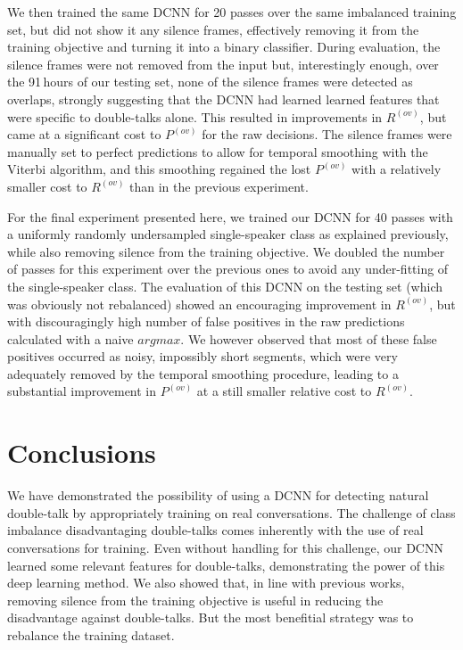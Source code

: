 \documentclass[a4paper]{article}
\begin{document}
We then trained the same DCNN for 20 passes over the same imbalanced training set,
but did not show it any silence frames, effectively removing it from the training objective and turning it into a binary classifier.
During evaluation, the silence frames were not removed from the input but,
interestingly enough, over the 91\,hours of our testing set,
none of the silence frames were detected as overlaps,
strongly suggesting that the DCNN had learned learned features that were specific to double-talks alone.
This resulted in improvements in $R^{(ov)}$, but came at a significant cost to $P^{(ov)}$ for the raw decisions.
The silence frames were manually set to perfect predictions to allow for temporal smoothing with the Viterbi algorithm,
and this smoothing regained the lost $P^{(ov)}$ with a relatively smaller cost to $R^{(ov)}$ than in the previous experiment.

For the final experiment presented here,
we trained our DCNN for 40 passes with a uniformly randomly undersampled single-speaker class as explained previously, while also removing silence from the training objective.
We doubled the number of passes for this experiment over the previous ones to avoid any under-fitting of the single-speaker class.
The evaluation of this DCNN on the testing set (which was obviously not rebalanced) showed an encouraging improvement in $R^{(ov)}$,
but with discouragingly high number of false positives in the raw predictions calculated with a naive $argmax$.
We however observed that most of these false positives occurred as noisy, impossibly short segments,
which were very adequately removed by the temporal smoothing procedure,
leading to a substantial improvement in $P^{(ov)}$ at a still smaller relative cost to $R^{(ov)}$.

\section{Conclusions}
We have demonstrated the possibility of using a DCNN for detecting natural double-talk by appropriately training on real conversations.
The challenge of class imbalance disadvantaging double-talks comes inherently with the use of real conversations for training.
Even without handling for this challenge, our DCNN learned some relevant features for double-talks,
demonstrating the power of this deep learning method.
We also showed that, in line with previous works,
removing silence from the training objective is useful in reducing the disadvantage against double-talks.
But the most benefitial strategy was to rebalance the training dataset.
\end{document}
